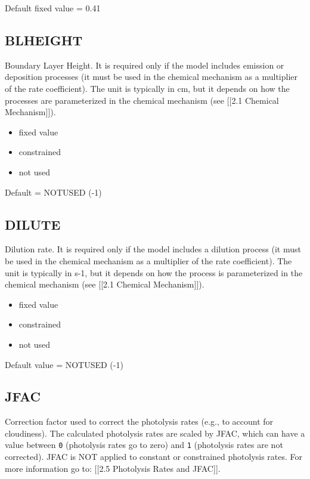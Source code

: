 Default fixed value = 0.41

\subsection{BLHEIGHT} \label{blheight}

Boundary Layer Height. It is required only if the model includes
emission or deposition processes (it must be used in the chemical
mechanism as a multiplier of the rate coefficient). The unit is
typically in cm, but it depends on how the processes are parameterized
in the chemical mechanism (see {[}{[}2.1 Chemical Mechanism{]}{]}).

\begin{itemize}
\item
  fixed value
\item
  constrained
\item
  not used
\end{itemize}

Default = NOTUSED (-1)

\subsection{DILUTE} \label{dilute}

Dilution rate. It is required only if the model includes a dilution
process (it must be used in the chemical mechanism as a multiplier of
the rate coefficient). The unit is typically in s-1, but it depends on
how the process is parameterized in the chemical mechanism (see
{[}{[}2.1 Chemical Mechanism{]}{]}).

\begin{itemize}
\item
  fixed value
\item
  constrained
\item
  not used
\end{itemize}

Default value = NOTUSED (-1)

\subsection{JFAC} \label{jfac}

Correction factor used to correct the photolysis rates (e.g., to account
for cloudiness). The calculated photolysis rates are scaled by JFAC,
which can have a value between \texttt{0} (photolysis rates go to zero)
and \texttt{1} (photolysis rates are not corrected). JFAC is NOT applied
to constant or constrained photolysis rates. For more information go to:
{[}{[}2.5 Photolysis Rates and JFAC{]}{]}.

